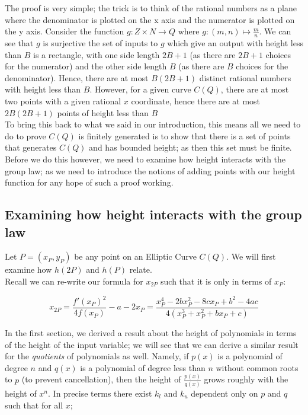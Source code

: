 \documentclass{article}
\begin{document}
The proof is very simple; the trick is to think of the rational numbers as a plane where the denominator is plotted on the x axis and the numerator is plotted on the y axis. Consider the function $g: Z \times N \rightarrow Q$ where $g: (m, n) \mapsto \frac{m}{n}$. We can see that $g$ is surjective the set of inputs to $g$ which give an output with height less than $B$ is a rectangle, with one side length $2B + 1$ (as there are $2B + 1$ choices for the numerator) and the other side length $B$ (as there are $B$ choices for the denominator). Hence, there are at most $B(2B + 1)$ distinct rational numbers with height less than $B$. However, for a given curve $C(Q)$, there are at most two points with a given rational $x$ coordinate, hence there are at most $2B(2B + 1)$ points of height less than $B$\\


To bring this back to what we said in our introduction, this means all we need to do to prove $C(Q)$ is finitely generated is to show that there is a set of points that generates $C(Q)$ and has bounded height; as then this set must be finite. Before we do this however, we need to examine how height interacts with the group law; as we need to introduce the notions of adding points with our height function for any hope of such a proof working.\\

\subsection{Examining how height interacts with the group law}

Let $P = (x_P, y_P)$ be any point on an Elliptic Curve $C(Q)$. We will first examine how $h(2P)$ and $h(P)$ relate.\\

Recall we can re-write our formula for $x_{2P}$ such that it is only in terms of $x_P$:

\[x_{2P} = \frac{f'(x_P)^2}{4 f(x_P)} - a - 2x_P = \frac{x_P^4 - 2bx_P^2 - 8cx_P + b^2 - 4ac}{4(x_P^3 +x_P^2 + bx_P + c)}\]

In the first section, we derived a result about the height of polynomials in terms of the height of the input variable; we will see that we can derive a similar result for the \emph{quotients} of polynomials as well. Namely, if $p(x)$ is a polynomial of degree $n$ and $q(x)$ is a polynomial of degree less than $n$ without common roots to $p$ (to prevent cancellation), then the height of $\frac{p(x)}{q(x)}$ grows roughly with the height of $x^n$. In precise terms there exist $k_l$ and $k_u$ dependent only on $p$ and $q$ such that for all $x$;
\end{document}
